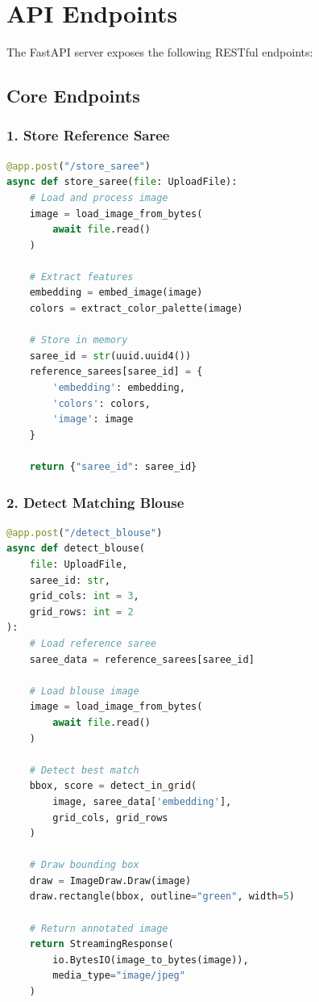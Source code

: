 \documentclass[12pt,a4paper]{report}
\begin{document}
\section{API Endpoints}

The FastAPI server exposes the following RESTful endpoints:

\subsection{Core Endpoints}

\subsubsection{1. Store Reference Saree}

\begin{lstlisting}[language=Python]
@app.post("/store_saree")
async def store_saree(file: UploadFile):
    # Load and process image
    image = load_image_from_bytes(
        await file.read()
    )
    
    # Extract features
    embedding = embed_image(image)
    colors = extract_color_palette(image)
    
    # Store in memory
    saree_id = str(uuid.uuid4())
    reference_sarees[saree_id] = {
        'embedding': embedding,
        'colors': colors,
        'image': image
    }
    
    return {"saree_id": saree_id}
\end{lstlisting}

\subsubsection{2. Detect Matching Blouse}

\begin{lstlisting}[language=Python]
@app.post("/detect_blouse")
async def detect_blouse(
    file: UploadFile,
    saree_id: str,
    grid_cols: int = 3,
    grid_rows: int = 2
):
    # Load reference saree
    saree_data = reference_sarees[saree_id]
    
    # Load blouse image
    image = load_image_from_bytes(
        await file.read()
    )
    
    # Detect best match
    bbox, score = detect_in_grid(
        image, saree_data['embedding'],
        grid_cols, grid_rows
    )
    
    # Draw bounding box
    draw = ImageDraw.Draw(image)
    draw.rectangle(bbox, outline="green", width=5)
    
    # Return annotated image
    return StreamingResponse(
        io.BytesIO(image_to_bytes(image)),
        media_type="image/jpeg"
    )
\end{lstlisting}
\end{document}

